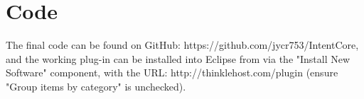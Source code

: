 \section{Code}

The final code can be found on GitHub: https://github.com/jycr753/IntentCore, and the working plug-in can be installed into Eclipse from via the "Install New Software" component, with the URL: http://thinklehost.com/plugin (ensure "Group items by category" is unchecked).